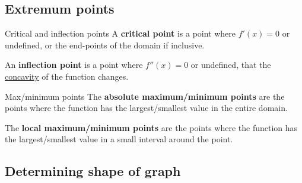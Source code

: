 \subsection{Extremum points}
\begin{definition}
    {Critical and inflection points}
    A \textbf{critical point} is a point where $f'(x)=0$ or undefined, or the end-points of the domain if inclusive.

    An \textbf{inflection point} is a point where $f''(x)=0$ or undefined, that the \hyperref[sec:concavity]{concavity} of the function changes.
\end{definition}
\begin{definition}
    {Max/minimum points}
    The \textbf{absolute maximum/minimum points} are the points where the function has the largest/smallest value in the entire domain.

    The \textbf{local maximum/minimum points} are the points where the function has the largest/smallest value in a small interval around the point.
\end{definition}

\subsection{Determining shape of graph}

